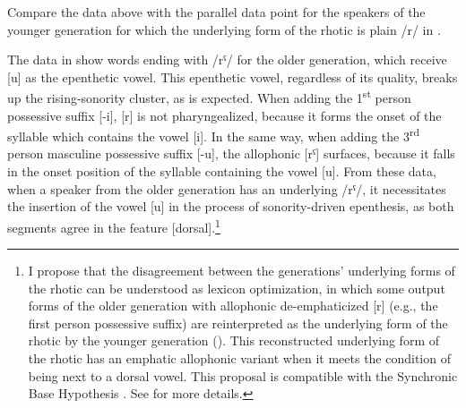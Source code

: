 \documentclass[output=paper,colorlinks,citecolor=brown]{langscibook}
\begin{document}
Compare the data above with the parallel data point for the speakers of the younger generation for which the underlying form of the rhotic is plain /r/ in .


\begin{table}
\caption{Underlying rhotic for speakers of the younger generation of UHA}
\label{underl}
\end{table}


The data in  show words ending with /rˤ/ for the older generation, which receive [u] as the epenthetic vowel. This epenthetic vowel, regardless of its quality, breaks up the rising-sonority cluster, as is expected. When adding the 1\textsuperscript{st} person possessive suffix [-i], [r] is not pharyngealized, because it forms the onset of the syllable which contains the vowel [i]. In the same way, when adding the 3\textsuperscript{rd} person masculine possessive suffix [-u], the allophonic [rˤ] surfaces, because it falls   in the onset position of the syllable containing the vowel [u]. From these data, when a speaker from the older generation has an underlying /rˤ/, it necessitates the insertion of the vowel [u] in the process of sonority-driven epenthesis, as both segments agree in the feature [dorsal].\footnote{I propose that the disagreement between the generations’ underlying forms of the rhotic can be understood as lexicon optimization, in which some output forms of the older generation with allophonic de-emphaticized [r] (e.g., the first person possessive suffix)  are reinterpreted as the underlying form of the rhotic by the younger generation (\cite[547--548]{Holt2015}). This reconstructed underlying form of the rhotic has an emphatic allophonic variant when it meets the condition of being next to a dorsal vowel. This proposal is compatible with the Synchronic Base Hypothesis \citep{Hutton1996}. See \citet[section 5.6]{Bokhari2020} for more details.}
\end{document}
